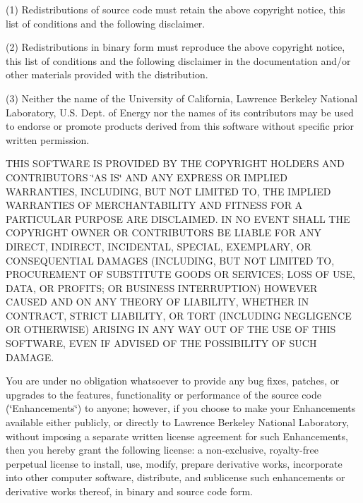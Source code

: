 (1) Redistributions of source code must retain the above copyright notice, this list of conditions and the following disclaimer.

(2) Redistributions in binary form must reproduce the above copyright notice, this list of conditions and the following disclaimer in the documentation and/or other materials provided with the distribution.

(3) Neither the name of the University of California, Lawrence Berkeley National Laboratory, U.\+S. Dept. of Energy nor the names of its contributors may be used to endorse or promote products derived from this software without specific prior written permission.

THIS SOFTWARE IS PROVIDED BY THE COPYRIGHT HOLDERS AND CONTRIBUTORS \char`\"{}\+AS IS\char`\"{} AND ANY EXPRESS OR IMPLIED WARRANTIES, INCLUDING, BUT NOT LIMITED TO, THE IMPLIED WARRANTIES OF MERCHANTABILITY AND FITNESS FOR A PARTICULAR PURPOSE ARE DISCLAIMED. IN NO EVENT SHALL THE COPYRIGHT OWNER OR CONTRIBUTORS BE LIABLE FOR ANY DIRECT, INDIRECT, INCIDENTAL, SPECIAL, EXEMPLARY, OR CONSEQUENTIAL DAMAGES (INCLUDING, BUT NOT LIMITED TO, PROCUREMENT OF SUBSTITUTE GOODS OR SERVICES; LOSS OF USE, DATA, OR PROFITS; OR BUSINESS INTERRUPTION) HOWEVER CAUSED AND ON ANY THEORY OF LIABILITY, WHETHER IN CONTRACT, STRICT LIABILITY, OR TORT (INCLUDING NEGLIGENCE OR OTHERWISE) ARISING IN ANY WAY OUT OF THE USE OF THIS SOFTWARE, EVEN IF ADVISED OF THE POSSIBILITY OF SUCH DAMAGE.

You are under no obligation whatsoever to provide any bug fixes, patches, or upgrades to the features, functionality or performance of the source code (\char`\"{}\+Enhancements\char`\"{}) to anyone; however, if you choose to make your Enhancements available either publicly, or directly to Lawrence Berkeley National Laboratory, without imposing a separate written license agreement for such Enhancements, then you hereby grant the following license\+: a non-\/exclusive, royalty-\/free perpetual license to install, use, modify, prepare derivative works, incorporate into other computer software, distribute, and sublicense such enhancements or derivative works thereof, in binary and source code form. 